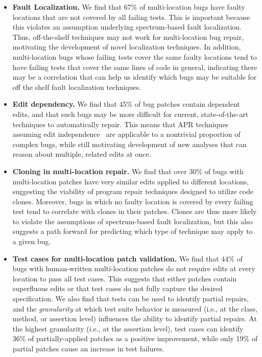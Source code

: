 \documentclass[10pt, conference]{IEEEtran}
\newcommand\bears{\textsc{Bears}\xspace}
\begin{document}
\begin{itemize}
\item \textbf{Fault Localization.}  We find that 67\% of multi-location bugs have faulty 
locations that are not
  covered by all failing tests.  This is important because this violates an assumption underlying 
  spectrum-based
  fault localization. Thus, off-the-shelf techniques may not work for
  multi-location bug repair, motivating the development of novel localization
  techniques. 
  In addition, multi-location bugs whose failing tests cover the same faulty locations tend to 
  have failing tests that cover the same lines of code in general, indicating there may be a 
  correlation that can help us identify which bugs may be suitable for off the shelf fault 
  localization techniques.
\item \textbf{Edit dependency.} We 
find that 45\% of bug patches contain dependent edits, and that such bugs
may be more difficult for current, state-of-the-art
techniques to automatically repair.  This means that APR techniques assuming edit
independence~\cite{saha2019harnessing, theotherone} are applicable to a nontrivial proportion of complex bugs, while
still motivating development of new analyses that can reason about multiple,
related edits at once. 
\item \textbf{Cloning in multi-location repair.} We find that over 30\% of bugs with multi-location
patches have very similar edits applied to different locations, suggesting the viability of 
program repair techniques designed to utilize code clones. Moreover, bugs in which 
no faulty location is covered by every failing test tend to correlate with
clones in their patches.  
Clones are thus more likely to violate the assumptions of spectrum-based fault 
localization, but this also suggests a path forward for predicting 
which type of technique may apply to a given bug. 
\item \textbf{Test cases for multi-location patch validation.}
  We find that 44\% of bugs with human-written multi-location patches do not
  require edits at every location to pass all test cases. This suggests that
  either patches contain superfluous edits or that test cases do not fully
  capture the desired specification. We also find that tests can be used to
  identify partial repairs, and the \emph{granularity} at which test suite
  behavior is measured (i.e., at the class, method, or assertion level)
  influences the ability to identify partial repairs. At the highest granularity
  (i.e., at the assertion level), test cases can identify 36\% of
  partially-applied patches as a positive improvement, while only 19\% of
  partial patches cause an increase in test failures.
\end{itemize}
\end{document}
